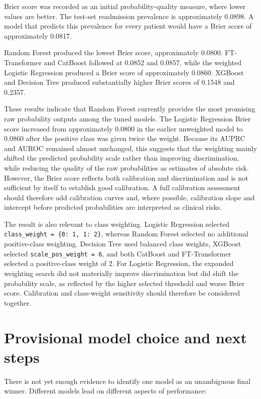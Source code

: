 \documentclass[11pt,a4paper]{article}
\begin{document}
Brier score was recorded as an initial probability-quality measure, where lower values are better. The test-set readmission prevalence is approximately 0.0898. A model that predicts this prevalence for every patient would have a Brier score of approximately 0.0817.

Random Forest produced the lowest Brier score, approximately 0.0800. FT-Transformer and CatBoost followed at 0.0852 and 0.0857, while the weighted Logistic Regression produced a Brier score of approximately 0.0860. XGBoost and Decision Tree produced substantially higher Brier scores of 0.1548 and 0.2357.

These results indicate that Random Forest currently provides the most promising raw probability outputs among the tuned models. The Logistic Regression Brier score increased from approximately 0.0800 in the earlier unweighted model to 0.0860 after the positive class was given twice the weight. Because its AUPRC and AUROC remained almost unchanged, this suggests that the weighting mainly shifted the predicted probability scale rather than improving discrimination, while reducing the quality of the raw probabilities as estimates of absolute risk. However, the Brier score reflects both calibration and discrimination and is not sufficient by itself to establish good calibration. A full calibration assessment should therefore add calibration curves and, where possible, calibration slope and intercept before predicted probabilities are interpreted as clinical risks.

The result is also relevant to class weighting. Logistic Regression selected \texttt{class\_weight = \{0: 1, 1: 2\}}, whereas Random Forest selected no additional positive-class weighting. Decision Tree used balanced class weights, XGBoost selected \texttt{scale\_pos\_weight = 6}, and both CatBoost and FT-Transformer selected a positive-class weight of 2. For Logistic Regression, the expanded weighting search did not materially improve discrimination but did shift the probability scale, as reflected by the higher selected threshold and worse Brier score. Calibration and class-weight sensitivity should therefore be considered together.

\section{Provisional model choice and next steps}

There is not yet enough evidence to identify one model as an unambiguous final winner. Different models lead on different aspects of performance:
\end{document}
